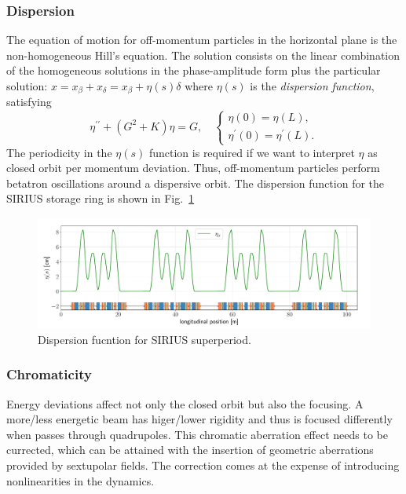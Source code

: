 \subsubsection{Dispersion}
The equation of motion for off-momentum particles in the horizontal plane is the non-homogeneous Hill's equation. The solution consists on the linear combination of the homogeneous solutions in the phase-amplitude form plus the particular solution: $x=x_\beta+ x_\delta = x_\beta+ \eta(s)\delta $ where $\eta(s)$ is the \textit{dispersion function}, satisfying
    \begin{equation*}
        \eta^{\prime\prime}+(G^2+K)\eta=G,\quad
        \begin{cases}
            \eta(0) = \eta(L),\\
            \eta^\prime(0) = \eta^\prime(L).
        \end{cases}
    \end{equation*}
    The periodicity in the $\eta(s)$ function is required if we want to interpret $\eta$ as closed orbit per momentum deviation. Thus, off-momentum particles perform betatron oscillations around a dispersive orbit. The dispersion function for the SIRIUS storage ring is shown in Fig.~\ref{dispersion_func}
    \begin{figure}[htb]
        \centering
        \includegraphics[width=\textwidth]{Images/dispersion.pdf}
        \caption{Dispersion fucntion for SIRIUS superperiod.}
        \label{dispersion_func}
    \end{figure}
\subsubsection{Chromaticity}
Energy deviations affect not only the closed orbit but also the focusing. A more/less energetic beam has higer/lower rigidity and thus is focused differently when passes through quadrupoles. This chromatic aberration effect needs to be currected, which can be attained with the insertion of geometric aberrations provided by sextupolar fields. The correction comes at the expense of introducing nonlinearities in the dynamics.

